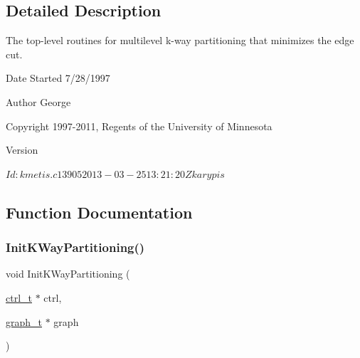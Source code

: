 \subsection{Detailed Description}
The top-\/level routines for multilevel k-\/way partitioning that minimizes the edge cut. 

\begin{DoxyDate}{Date}
Started 7/28/1997 
\end{DoxyDate}
\begin{DoxyAuthor}{Author}
George 

Copyright 1997-\/2011, Regents of the University of Minnesota 
\end{DoxyAuthor}
\begin{DoxyVersion}{Version}
\begin{DoxyVerb}$Id: kmetis.c 13905 2013-03-25 13:21:20Z karypis $ \end{DoxyVerb}
 
\end{DoxyVersion}


\subsection{Function Documentation}
\mbox{\label{a00909_a870e37cc14eb1033c62d83d3a7c33a91}} 
\subsubsection{\texorpdfstring{Init\+K\+Way\+Partitioning()}{InitKWayPartitioning()}}
{\footnotesize\ttfamily void Init\+K\+Way\+Partitioning (\begin{DoxyParamCaption}\item[{\hyperlink{a00742}{ctrl\+\_\+t} $\ast$}]{ctrl,  }\item[{\hyperlink{a00734}{graph\+\_\+t} $\ast$}]{graph }\end{DoxyParamCaption})}

